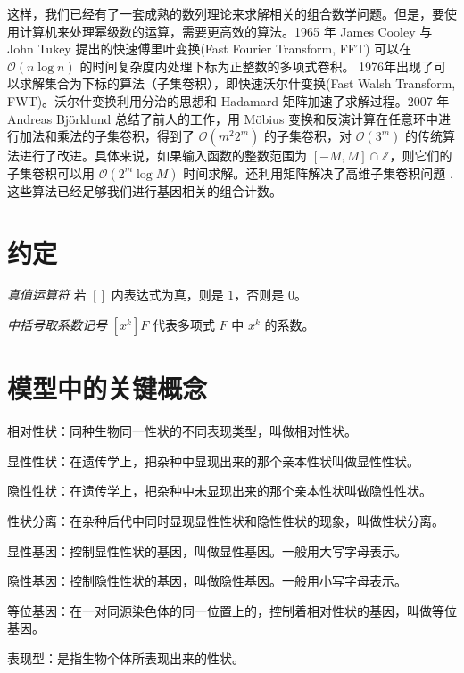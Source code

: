 \documentclass[12pt]{article} %
\begin{document}
这样，我们已经有了一套成熟的数列理论来求解相关的组合数学问题。但是，要使用计算机来处理幂级数的运算，需要更高效的算法。1965 年 James Cooley 与 John Tukey 提出的快速傅里叶变换(Fast Fourier Transform, FFT)\cite{cooley1965algorithm} 可以在 $\mathcal{O}(n\log n)$ 的时间复杂度内处理下标为正整数的多项式卷积。
1976年出现了可以求解集合为下标的算法（子集卷积），即快速沃尔什变换(Fast Walsh Transform, FWT)\cite{maslen1997generalized}。沃尔什变换利用分治的思想和 Hadamard 矩阵加速了求解过程\cite{coppersmith1987matrix}。2007 年 Andreas Björklund 总结了前人的工作，用 Möbius 变换和反演计算在任意环中进行加法和乘法的子集卷积，得到了 $\mathcal{O}(m^2 2^m)$ 的子集卷积，对 $\mathcal{O}(3^m)$ 的传统算法进行了改进。具体来说，如果输入函数的整数范围为 $[-M,M]\cap \mathbb{Z}$，则它们的子集卷积可以用 $\mathcal{O}(2^m\log M)$ 时间求解。还利用矩阵解决了高维子集卷积问题 \cite{10.1145/1250790.1250801}. 这些算法已经足够我们进行基因相关的组合计数。

\newpage

\section{约定}

\textsl{真值运算符} \qquad 若 $[]$ 内表达式为真，则是 $1$，否则是 $0$。

\textsl{中括号取系数记号} \qquad $[x^k]F$ 代表多项式 $F$ 中 $x^k$ 的系数。

\section{模型中的关键概念}


相对性状\cite{2009陈阅增普通生物学}：同种生物同一性状的不同表现类型，叫做相对性状。

显性性状：在遗传学上，把杂种中显现出来的那个亲本性状叫做显性性状。

隐性性状：在遗传学上，把杂种中未显现出来的那个亲本性状叫做隐性性状。

性状分离：在杂种后代中同时显现显性性状和隐性性状的现象，叫做性状分离。

显性基因：控制显性性状的基因，叫做显性基因。一般用大写字母表示。

隐性基因：控制隐性性状的基因，叫做隐性基因。一般用小写字母表示。

等位基因：在一对同源染色体的同一位置上的，控制着相对性状的基因，叫做等位基因。

表现型：是指生物个体所表现出来的性状。
\end{document}

